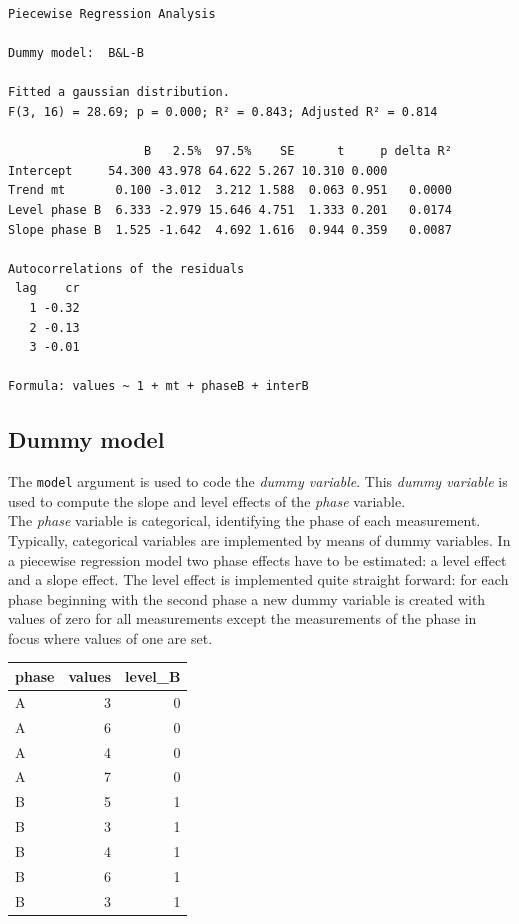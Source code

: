 \documentclass[
]{book}
\begin{document}
\begin{verbatim}
Piecewise Regression Analysis

Dummy model:  B&L-B 

Fitted a gaussian distribution.
F(3, 16) = 28.69; p = 0.000; R² = 0.843; Adjusted R² = 0.814

                   B   2.5%  97.5%    SE      t     p delta R²
Intercept     54.300 43.978 64.622 5.267 10.310 0.000         
Trend mt       0.100 -3.012  3.212 1.588  0.063 0.951   0.0000
Level phase B  6.333 -2.979 15.646 4.751  1.333 0.201   0.0174
Slope phase B  1.525 -1.642  4.692 1.616  0.944 0.359   0.0087

Autocorrelations of the residuals
 lag    cr
   1 -0.32
   2 -0.13
   3 -0.01

Formula: values ~ 1 + mt + phaseB + interB
\end{verbatim}

\hypertarget{dummy-model}{%
\subsection{Dummy model}\label{dummy-model}}

The \texttt{model} argument is used to code the \emph{dummy variable}. This \emph{dummy variable} is used to compute the slope and level effects of the \emph{phase} variable.\\
The \emph{phase} variable is categorical, identifying the phase of each measurement. Typically, categorical variables are implemented by means of dummy variables. In a piecewise regression model two phase effects have to be estimated: a level effect and a slope effect. The level effect is implemented quite straight forward: for each phase beginning with the second phase a new dummy variable is created with values of zero for all measurements except the measurements of the phase in focus where values of one are set.

\begin{tabular}{l|r|r}
\hline
phase & values & level\_B\\
\hline
A & 3 & 0\\
\hline
A & 6 & 0\\
\hline
A & 4 & 0\\
\hline
A & 7 & 0\\
\hline
B & 5 & 1\\
\hline
B & 3 & 1\\
\hline
B & 4 & 1\\
\hline
B & 6 & 1\\
\hline
B & 3 & 1\\
\hline
\end{tabular}
\end{document}
